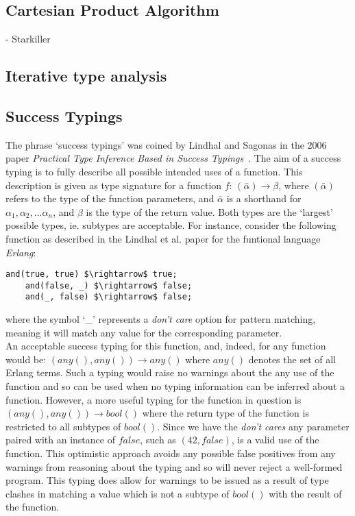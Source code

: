 \documentclass[12pt, titlepage]{article}
\begin{document}
\subsection{Cartesian Product Algorithm}
- Starkiller

\subsection{Iterative type analysis}

\subsection{Success Typings}
The phrase `success typings' was coined by Lindhal and Sagonas in the 2006 paper \textit{Practical Type Inference Based in Success Typings}~\cite{lindhal06}. The aim of a success typing is to fully describe all possible intended uses of a function. This description is given as type signature for a function $f$: $(\bar{\alpha}) \rightarrow \beta$, where $(\bar{\alpha})$ refers to the type of the function parameters, and $\bar{\alpha}$ is a shorthand for $\alpha_1, \alpha_2,...\alpha_n$, and $\beta$ is the type of the return value. Both types are the `largest' possible types, ie. subtypes are acceptable. For instance, consider the following function as described in the Lindhal et al. paper for the funtional language \textit{Erlang}:
\begin{lstlisting}[mathescape]
	and(true, true) $\rightarrow$ true;
	and(false, _) $\rightarrow$ false;
	and(_, false) $\rightarrow$ false;
\end{lstlisting}
where the symbol `\_' represents a \textit{don't care} option for pattern matching, meaning it will match any value for the corresponding parameter. \\
An acceptable success typing for this function, and, indeed, for any function would be: $(any(), any()) \rightarrow any()$ where $any()$ denotes the set of all Erlang terms. Such a typing would raise no warnings about the any use of the function and so can be used when no typing information can be inferred about a function. However, a more useful typing for the function in question is $(any(), any()) \rightarrow bool()$ where the return type of the function is restricted to all subtypes of $bool()$. Since we have the \textit{don't cares} any parameter paired with an instance of $false$, such as $(42, false)$, is a valid use of the function. This optimistic approach avoids any possible false positives from any warnings from reasoning about the typing and so will never reject a well-formed program. This typing does allow for warnings to be issued as a result of type clashes in matching a value which is not a subtype of $bool()$ with the result of the function. \\
\end{document}
